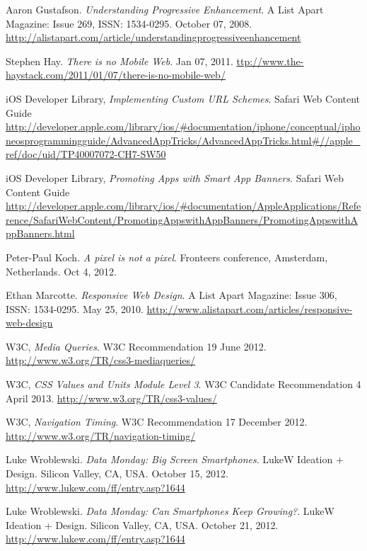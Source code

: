 \begin{thebibliography}{9}
  Aaron Gustafson.
  \emph{Understanding Progressive Enhancement}.
  A List Apart Magazine: Issue 269,
  ISSN: 1534-0295.
  October 07, 2008.
  \url{http://alistapart.com/article/understandingprogressiveenhancement}

  Stephen Hay.
  \emph{There is no Mobile Web}.
  Jan 07, 2011.
  \url{ttp://www.the-haystack.com/2011/01/07/there-is-no-mobile-web/}

  iOS Developer Library,
  \emph{Implementing Custom URL Schemes}.
  Safari Web Content Guide
  \url{http://developer.apple.com/library/ios/#documentation/iphone/conceptual/iphoneosprogrammingguide/AdvancedAppTricks/AdvancedAppTricks.html#//apple_ref/doc/uid/TP40007072-CH7-SW50}

  iOS Developer Library,
  \emph{Promoting Apps with Smart App Banners}.
  Safari Web Content Guide
  \url{http://developer.apple.com/library/ios/#documentation/AppleApplications/Reference/SafariWebContent/PromotingAppswithAppBanners/PromotingAppswithAppBanners.html}
  
  Peter-Paul Koch.
  \emph{A pixel is not a pixel}.
  Fronteers conference,
  Amsterdam, Netherlands.
  Oct 4, 2012.

  Ethan Marcotte.
  \emph{Responsive Web Design}.
  A List Apart Magazine: Issue 306,
  ISSN: 1534-0295.
  May 25, 2010.
  \url{http://www.alistapart.com/articles/responsive-web-design}

  W3C,
  \emph{Media Queries}.
  W3C Recommendation 19 June 2012.
  \url{http://www.w3.org/TR/css3-mediaqueries/}

  W3C,
  \emph{CSS Values and Units Module Level 3}.
  W3C Candidate Recommendation 4 April 2013.
  \url{http://www.w3.org/TR/css3-values/}

  W3C,
  \emph{Navigation Timing}.
  W3C Recommendation 17 December 2012.
  \url{http://www.w3.org/TR/navigation-timing/}

  Luke Wroblewski.
  \emph{Data Monday: Big Screen Smartphones}.
  LukeW Ideation + Design.
  Silicon Valley, CA, USA.
  October 15, 2012.
  \url{http://www.lukew.com/ff/entry.asp?1644}

  Luke Wroblewski.
  \emph{Data Monday: Can Smartphones Keep Growing?}.
  LukeW Ideation + Design.
  Silicon Valley, CA, USA.
  October 21, 2012.
  \url{http://www.lukew.com/ff/entry.asp?1644}


\end{thebibliography}
